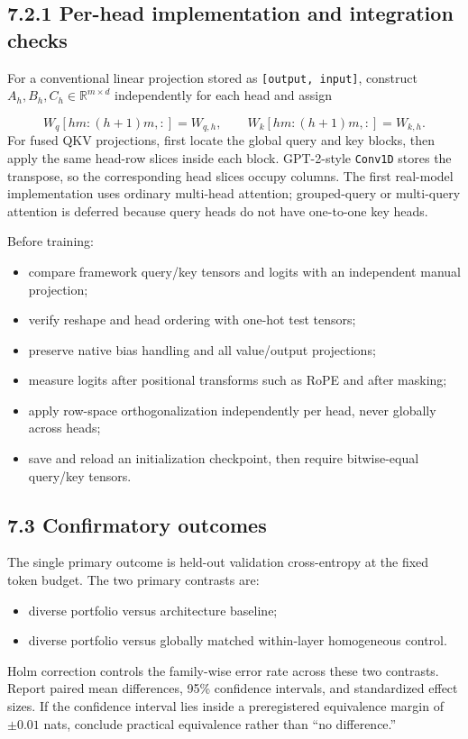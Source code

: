 \documentclass[11pt,letterpaper]{article}
\theoremstyle{definition}
\begin{document}
\subsection{7.2.1 Per-head implementation and integration checks}
For a conventional linear projection stored as \texttt{[output, input]}, construct $A_h,B_h,C_h\in\mathbb R^{m\times d}$ independently for each head and assign

\[
W_q[hm:(h+1)m,:]=W_{q,h},\qquad
W_k[hm:(h+1)m,:]=W_{k,h}.
\]
For fused QKV projections, first locate the global query and key blocks, then apply the same head-row slices inside each block. GPT-2-style \texttt{Conv1D} stores the transpose, so the corresponding head slices occupy columns. The first real-model implementation uses ordinary multi-head attention; grouped-query or multi-query attention is deferred because query heads do not have one-to-one key heads.

Before training:

\begin{itemize}
  \item compare framework query/key tensors and logits with an independent manual projection;
  \item verify reshape and head ordering with one-hot test tensors;
  \item preserve native bias handling and all value/output projections;
  \item measure logits after positional transforms such as RoPE and after masking;
  \item apply row-space orthogonalization independently per head, never globally across heads;
  \item save and reload an initialization checkpoint, then require bitwise-equal query/key tensors.
\end{itemize}
\subsection{7.3 Confirmatory outcomes}
The single primary outcome is held-out validation cross-entropy at the fixed token budget. The two primary contrasts are:

\begin{itemize}
  \item diverse portfolio versus architecture baseline;
  \item diverse portfolio versus globally matched within-layer homogeneous control.
\end{itemize}
Holm correction controls the family-wise error rate across these two contrasts. Report paired mean differences, 95\% confidence intervals, and standardized effect sizes. If the confidence interval lies inside a preregistered equivalence margin of $\pm0.01$ nats, conclude practical equivalence rather than “no difference.”
\end{document}
